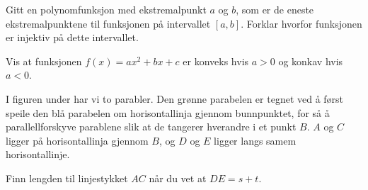 





\opgt

\nes

\nes

\nes

\nes
{}
Gitt en polynomfunksjon med ekstremalpunkt $ a $ og $ b $, som er de eneste ekstremalpunktene til funksjonen på intervallet $ [a, b] $. Forklar hvorfor funksjonen er injektiv på dette intervallet.

Vis at funksjonen $ {f(x)=a x^2+b x + c}  $ er konveks hvis $ {a>0} $ og konkav hvis $ {a<0} $.

I figuren under har vi to parabler. Den grønne parabelen er tegnet ved å først speile den blå parabelen om horisontallinja gjennom bunnpunktet, for så å parallellforskyve parablene slik at de tangerer hverandre i et punkt $ B $. $ A $ og $ C $ ligger på horisontallinja gjennom $ B $, og $ D $ og $ E $ ligger langs samem horisontallinje.\os

Finn lengden til linjestykket $ AC $ når du vet at $ DE=s+t $.
